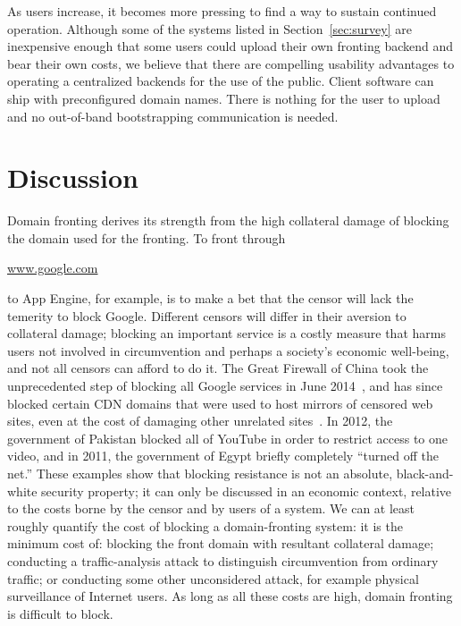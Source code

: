 \documentclass{sig-alternate}
\def\urll#1{\begin{NoHyper}\url{#1}\end{NoHyper}}
\begin{document}
As users increase, it becomes more pressing
to find a way to sustain continued operation.
Although some of the systems listed in Section~\ref{sec:survey}
are inexpensive enough that some users could upload their own fronting backend
and bear their own costs,
we believe that there are compelling usability advantages
to operating a centralized backends for the use of the public.
Client software can ship with preconfigured domain names.
There is nothing for the user to upload and no out-of-band bootstrapping communication is needed.


\section{Discussion}
\label{sec:discussion}

Domain fronting derives its strength from the
high collateral damage of blocking the domain used for the fronting.
To front through \urll{www.google.com} to App Engine, for example,
is to make a bet that the censor will lack the temerity to block Google.
Different censors will differ in their aversion to collateral damage;
blocking an important service is a costly measure
that harms users not involved in circumvention and perhaps a society's economic well-being,
and not all censors can afford to do it.
The Great Firewall of China took the unprecedented step
of blocking all Google services in June 2014~\cite{cn-google-block,cn-google-block-greatfire},
and has since blocked certain CDN domains that were used to host
mirrors of censored web sites, even at the cost of damaging other unrelated sites~\cite{cn-edgecast-block-greatfire}.
In 2012, the government of Pakistan blocked all of YouTube
in order to restrict access to one video,
and in 2011, the government of Egypt briefly completely ``turned off the net.''
These examples show that blocking resistance is not an absolute,
black-and-white security property;
it can only be discussed in an economic context, relative to the costs borne
by the censor and by users of a system.
We can at least roughly quantify the cost of blocking a domain-fronting system:
it is the minimum cost of:
blocking the front domain with resultant collateral damage;
conducting a traffic-analysis attack to distinguish
circumvention from ordinary traffic; or
conducting some other unconsidered attack, for example physical surveillance of Internet users.
As long as all these costs are high,
domain fronting is difficult to block.
\end{document}
